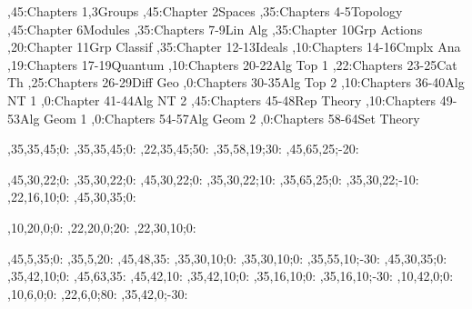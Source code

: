 
\setcounter{diagheight}{50}
\begin{chart}
,45:{Chapters 1,3}{Groups}{}
,45:{Chapter 2}{Spaces}{}
,35:{Chapters 4-5}{Topology}{}
,45:{Chapter 6}{Modules}{}
,35:{Chapters 7-9}{Lin Alg}{}
,35:{Chapter 10}{Grp Actions}{}
,20:{Chapter 11}{Grp Classif}{}
,35:{Chapter 12-13}{Ideals}{}
,10:{Chapters 14-16}{Cmplx Ana}{}
,19:{Chapters 17-19}{Quantum}{}
,10:{Chapters 20-22}{Alg Top 1}{}
,22:{Chapters 23-25}{Cat Th}{}
,25:{Chapters 26-29}{Diff Geo}{}
,0:{Chapters 30-35}{Alg Top 2}{}
,10:{Chapters 36-40}{Alg NT 1}{}
,0:{Chapter 41-44}{Alg NT 2}{}
,45:{Chapters 45-48}{Rep Theory}{}
,10:{Chapters 49-53}{Alg Geom 1}{}
,0:{Chapters 54-57}{Alg Geom 2}{}
,0:{Chapters 58-64}{Set Theory}{}

,35,35,45;0:   %
,35,35,45;0:   %
,22,35,45;50: %
,35,58,19;30:  %
,45,65,25;-20: %

,45,30,22;0:   %
,35,30,22;0:   %
,45,30,22;0:   %
,35,30,22;10:  %
,35,65,25;0:   %
,35,30,22;-10: %
,22,16,10;0:   %
,45,30,35;0:   %

,10,20,0;0:    %
,22,20,0;20:   %
,22,30,10;0:   %

,45,5,35;0:    %
,35,5,20:      %
,45,48,35:     %
,35,30,10;0:   %
,35,30,10;0:   %
,35,55,10;-30: %
,45,30,35;0:   %
,35,42,10;0:   %
,45,63,35:     %
,45,42,10:     %
,35,42,10;0:   %
,35,16,10;0:   %
,35,16,10;-30: %
,10,42,0;0:    %
,10,6,0;0:     %
,22,6,0;80:     %
,35,42,0;-30:  %
\end{chart}
